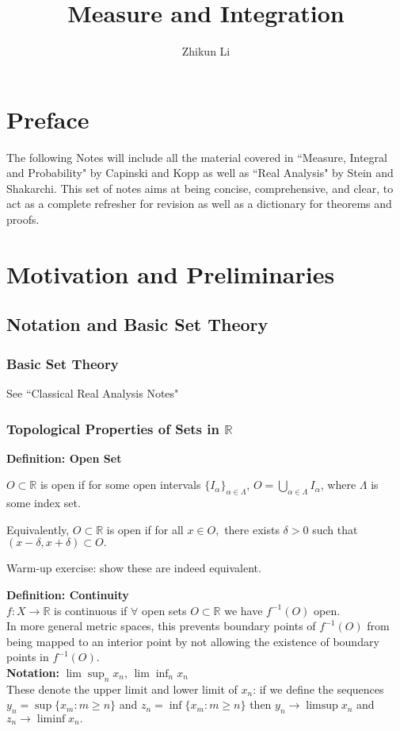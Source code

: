 \documentclass{article}
\title{Measure and Integration}
\author{Zhikun Li}
\date{}
\newcommand{\R}{\mathbb{R}}
\newcommand{\0}{{\bf{0}}}
\newcommand{\1}{{\bf{1}}}
\begin{document}
\maketitle
\section*{Preface}
The following Notes will include all the material covered in ``Measure, Integral and Probability" by Capinski and Kopp as well as ``Real Analysis" by Stein and Shakarchi.
This set of notes aims at being concise, comprehensive, and clear, to act as a complete refresher for revision as well as a dictionary for theorems and proofs.
\tableofcontents
\clearpage
\section{Motivation and Preliminaries}
\subsection{Notation and Basic Set Theory}
\subsubsection{Basic Set Theory}
\null\hfill{See ``Classical Real Analysis Notes"}
\subsubsection{Topological Properties of Sets in $\R$}
\textbf{Definition: Open Set}

$O\subset\R$ is open if for some open intervals $\{I_\alpha\}_{\alpha\in\Lambda}$, $O=\bigcup\limits_{\alpha\in\Lambda}I_\alpha$, where $\Lambda$ is some index set.

Equivalently, $O\subset\R$ is open if for all $x \in O,$ there exists $\delta > 0$ such that $(x - \delta, x + \delta) \subset O.$

Warm-up exercise: show these are indeed equivalent.

\textbf{Definition: Continuity}\\
$f:X\to\R$ is continuous if $\forall$ open sets $O\subset \R$ we have $f^{-1}(O)$ open.\\
In more general metric spaces, this prevents boundary points of $f^{-1}(O)$ from being mapped to an interior point by not allowing the existence of boundary points in $f^{-1}(O)$.\\
\textbf{Notation:} $\lim\sup_nx_n$, $\lim\inf_nx_n$\\
These denote the upper limit and lower limit of $x_n$: if we define the sequences $y_n = \sup\{x_m: m \geq n\}$ and $z_n = \inf \{x_m: m \geq n\}$ then $y_n \xrightarrow{} \limsup{x_n}$ and $z_n \xrightarrow{} \liminf{x_n}.$
\end{document}
